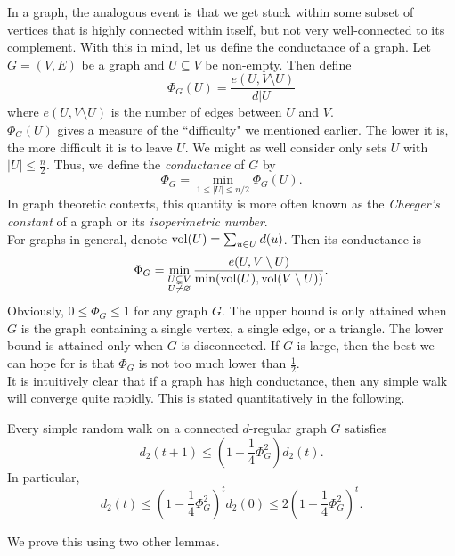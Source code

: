 In a graph, the analogous event is that we get stuck within some subset of vertices that is highly connected within itself, but not very well-connected to its complement. With this in mind, let us define the conductance of a graph. Let $G=(V,E)$ be a graph and $U\subseteq V$ be non-empty. Then define
\[ \Phi_G(U) = \frac{e(U,V\setminus U)}{d|U|} \]
where $e(U,V\setminus U)$ is the number of edges between $U$ and $V$.\\
$\Phi_G(U)$ gives a measure of the ``difficulty" we mentioned earlier. The lower it is, the more difficult it is to leave $U$. We might as well consider only sets $U$ with $|U|\leq\frac{n}{2}$. Thus, we define the \textit{conductance} of $G$ by
\[ \Phi_G = \min_{1\leq|U|\leq n/2}\Phi_G(U). \]
In graph theoretic contexts, this quantity is more often known as the \textit{Cheeger's constant} of a graph or its \textit{isoperimetric number}.\\

For graphs in general, denote $\operatorname{vol}(U)=\sum_{u\in U}d(u)$. Then its conductance is
\[ \Phi_G = \min_{\substack{ U\subsetneq V \\ U\neq\varnothing}} \frac{e(U,V\setminus U)}{\min(\operatorname{vol}(U),\operatorname{vol}(V\setminus U))}. \]
Obviously, $0\leq\Phi_G\leq 1$ for any graph $G$. The upper bound is only attained when $G$ is the graph containing a single vertex, a single edge, or a triangle. The lower bound is attained only when $G$ is disconnected. If $G$ is large, then the best we can hope for is that $\Phi_G$ is not too much lower than $\frac{1}{2}$.\\

It is intuitively clear that if a graph has high conductance, then any simple walk will converge quite rapidly. This is stated quantitatively in the following.

\begin{ftheo}
\label{random walk speed of convergence conductance}
Every simple random walk on a connected $d$-regular graph $G$ satisfies
\[ d_2(t+1) \leq \left(1-\frac{1}{4}\Phi_G^2\right) d_2(t). \]
In particular,
\[ d_2(t) \leq \left(1-\frac{1}{4}\Phi_G^2\right)^t d_2(0) \leq 2\left(1-\frac{1}{4}\Phi_G^2\right)^t. \]
\end{ftheo}

We prove this using two other lemmas.

